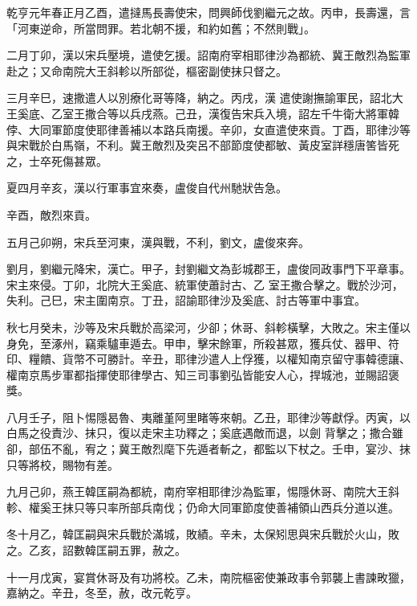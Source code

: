 \begin{pinyinscope}
 乾亨元年春正月乙酉，遣撻馬長壽使宋，問興師伐劉繼元之故。丙申，長壽還，言「河東逆命，所當問罪。若北朝不援，和約如舊；不然則戰」。



 二月丁卯，漢以宋兵壓境，遣使乞援。詔南府宰相耶律沙為都統、冀王敵烈為監軍赴之；又命南院大王斜軫以所部從，樞密副使抹只督之。



 三月辛巳，速撒遣人以別療化哥等降，納之。丙戌，漢
 遣使謝撫諭軍民，詔北大王奚底、乙室王撒合等以兵戌燕。己丑，漢復告宋兵入境，詔左千牛衛大將軍韓侼、大同軍節度使耶律善補以本路兵南援。辛卯，女直遣使來貢。丁酉，耶律沙等與宋戰於白馬嶺，不利。冀王敵烈及突呂不部節度使都敏、黃皮室詳穩唐筈皆死之，士卒死傷甚眾。



 夏四月辛亥，漢以行軍事宜來奏，盧俊自代州馳狀告急。



 辛酉，敵烈來貢。



 五月己卯朔，宋兵至河東，漢與戰，不利，劉文，盧俊來奔。



 劉月，劉繼元降宋，漢亡。甲子，封劉繼文為彭城郡王，盧俊同政事門下平章事。宋主來侵。丁卯，北院大王奚底、統軍使蕭討古、乙
 室王撒合擊之。戰於沙河，失利。己巳，宋主圍南京。丁丑，詔諭耶律沙及奚底、討古等軍中事宜。



 秋七月癸未，沙等及宋兵戰於高梁河，少卻；休哥、斜軫橫擊，大敗之。宋主僅以身免，至涿州，竊乘驢車遁去。甲申，擊宋餘軍，所殺甚眾，獲兵仗、器甲、符印、糧饋、貨幣不可勝計。辛丑，耶律沙遣人上俘獲，以權知南京留守事韓德讓、權南京馬步軍都指揮使耶律學古、知三司事劉弘皆能安人心，捍城池，並賜詔褒獎。



 八月壬子，阻卜惕隱曷魯、夷離堇阿里睹等來朝。乙丑，耶律沙等獻俘。丙寅，以白馬之役責沙、抹只，復以走宋主功釋之；奚底遇敵而退，以劍
 背擊之；撒合雖卻，部伍不亂，宥之；冀王敵烈麾下先遁者斬之，都監以下杖之。壬申，宴沙、抹只等將校，賜物有差。



 九月己卯，燕王韓匡嗣為都統，南府宰相耶律沙為監軍，惕隱休哥、南院大王斜軫、權奚王抹只等只率所部兵南伐；仍命大同軍節度使善補領山西兵分道以進。



 冬十月乙，韓匡嗣與宋兵戰於滿城，敗績。辛未，太保矧思與宋兵戰於火山，敗之。乙亥，詔數韓匡嗣五罪，赦之。



 十一月戊寅，宴賞休哥及有功將校。乙未，南院樞密使兼政事令郭襲上書諫畋獵，嘉納之。辛丑，冬至，赦，改元乾亨。




\end{pinyinscope}
